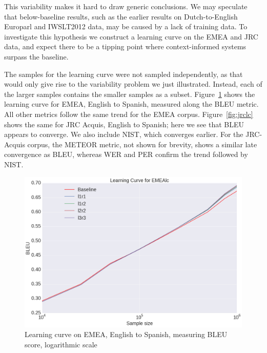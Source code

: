 \documentclass[smallextended]{svjour3}       %
\theoremstyle{break}
\begin{document}
This variability makes it hard to draw generic conclusions.  We may speculate
that below-baseline results, such as the earlier results on Dutch-to-English
Europarl and IWSLT2012 data, may be caused by a lack of training data. To
investigate this hypothesis we construct a learning curve on the EMEA and JRC
data, and expect there to be a tipping point where context-informed systems
surpass the baseline.

The samples for the learning curve were not sampled independently, as that
would only give rise to the variability problem we just illustrated.  Instead,
each of the larger samples contains the smaller samples as a subset.
Figure~\ref{fig:emealc} shows the learning curve for EMEA, English to Spanish,
measured along the BLEU metric. All other metrics follow the same trend for the
EMEA corpus.  Figure~\ref{fig:jrclc} shows the same for JRC Acquis, English to
Spanish; here we see that BLEU appears to converge. We also include
NIST, which converges earlier. For the JRC-Acquis corpus, the METEOR metric, not shown for
brevity, shows a similar late convergence as BLEU, whereas WER and PER confirm
the trend followed by NIST.

\begin{figure}
\includegraphics[width=120.00mm]{emealcbleu.png}
\caption{Learning curve on EMEA, English to Spanish, measuring BLEU score, logarithmic scale}
\label{fig:emealc}
\end{figure}
\end{document}
